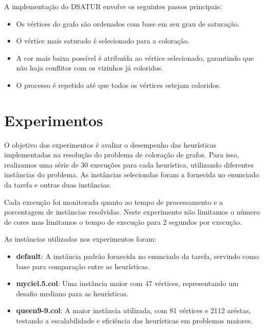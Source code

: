 \documentclass[12pt,a4paper]{article}
\begin{document}
A implementação do DSATUR envolve os seguintes passos principais:

\begin{itemize}
 \item Os vértices do grafo são ordenados com base em seu grau de saturação.
 \item O vértice mais saturado é selecionado para a coloração.
 \item A cor mais baixa possível é atribuída ao vértice selecionado, garantindo que não haja conflitos com os vizinhos já coloridos.
 \item O processo é repetido até que todos os vértices estejam coloridos.
\end{itemize}

\section{Experimentos}

O objetivo dos experimentos é avaliar o desempenho das heurísticas implementadas na resolução do problema de coloração de grafos. Para isso, realizamos uma série de 30 execuções para cada heurística, utilizando diferentes instâncias do problema. As instâncias seleciondas foram a fornecida no enunciado da tarefa e outras duas instâncias.

Cada execução foi monitorada quanto ao tempo de processamento e a porcentagem de instâncias resolvidas. Neste experimento não limitamos o número de cores mas limitamos o tempo de execução para 2 segundos por execução.

As instâncias utilizadas nos experimentos foram:

\begin{itemize}
 \item \textbf{default}: A instância padrão fornecida no enunciado da tarefa, servindo como base para comparação entre as heurísticas.
 \item \textbf{myciel.5.col}: Uma instância maior com 47 vértices, representando um desafio mediano para as heurísticas.
 \item \textbf{queen9-9.col}: A maior instância utilizada, com 81 vértices e 2112 aréstas, testando a escalabilidade e eficiência das heurísticas em problemas maiores.
\end{itemize}
\end{document}

